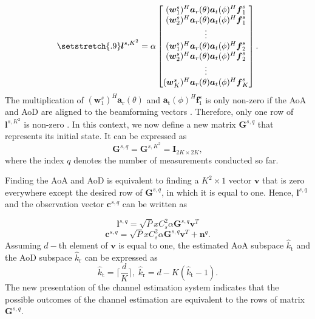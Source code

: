 \documentclass{ieeeaccess}
\begin{document}
\begin{equation} \label{n19}
\setstretch{.9}
\boldsymbol{l}^{s,K^2} =
  \alpha
\begin{bmatrix}
    (\boldsymbol{w}^s_1)^H\boldsymbol{a}_r(\theta) \boldsymbol{a}_t(\phi)^H \boldsymbol{f}^s_1  \\
    (\boldsymbol{w}^s_2)^H\boldsymbol{a}_r(\theta) \boldsymbol{a}_t(\phi)^H \boldsymbol{f}^s_1   \\
    \vdots  \\
    (\boldsymbol{w}^s_1)^H\boldsymbol{a}_r(\theta) \boldsymbol{a}_t(\phi)^H \boldsymbol{f}^s_2  \\
    (\boldsymbol{w}^s_2)^H\boldsymbol{a}_r(\theta) \boldsymbol{a}_t(\phi)^H \boldsymbol{f}^s_2   \\
    \vdots  \\
    (\boldsymbol{w}^s_K)^H\boldsymbol{a}_r(\theta) \boldsymbol{a}_t(\phi)^H \boldsymbol{f}^s_{K}
\end{bmatrix}.
\end{equation}
The multiplication of $(\boldsymbol{w}^s_1)^H\boldsymbol{a}_\textrm{r}(\theta)$ and $\boldsymbol{a}_\textrm{t}(\phi)^H \boldsymbol{f}^s_1$ is only non-zero if the AoA and AoD are aligned to the beamforming vectors \cite{RACE,RH,shaham2018raf}. Therefore, only one row of $\boldsymbol{l}^{s,K^2}$ is non-zero \cite{RH}. In this context, we now define a new matrix $\boldsymbol{G}^{s,q}$ that represents its initial state. It can be expressed as
\begin{equation} \label{n20}
 \boldsymbol{G}^{s,q}=  \boldsymbol{G}^{s,K^2}  =  \mathbf{I}_{2K \times 2K},
\end{equation}
where the index $q$ denotes the number of measurements conducted so far.

Finding the AoA and AoD is equivalent to finding a $K^2 \times 1$ vector $\boldsymbol{v}$ that is zero everywhere except the desired row of $\boldsymbol{G}^{s,q}$, in which it is equal to one. Hence, $\boldsymbol{l}^{s,q}$ and the observation vector $\boldsymbol{c}^{s,q}$ can be written as

\begin{equation} \label{n21}
 \boldsymbol{l}^{s,q} = \sqrt{P}xC_s^2 \alpha  \boldsymbol{G}^{s,q}\boldsymbol{v}^T
\end{equation}
\begin{equation} \label{n22}
\boldsymbol{c}^{s,q} = \sqrt{P}xC_s^2 \alpha  \boldsymbol{G}^{s,q}\boldsymbol{v}^T + \boldsymbol{n}^{q}.
\end{equation}
Assuming $d-$th element of $\boldsymbol{v}$ is equal to one, the estimated AoA subspace $\hat{k}_\textrm{t}$ and the AoD subspace $\hat{k}_\textrm{r}$ can be expressed as
\begin{equation} \label{n23}
\hat{k}_\textrm{t} = \lceil \dfrac{d}{K} \rceil ,\; \hat{k}_\textrm{r} = d - K(\hat{k}_\textrm{t} - 1).
\end{equation}
The new presentation of the channel estimation system indicates that the possible outcomes of the channel estimation are equivalent to the rows of matrix $\boldsymbol{G}^{s,q}$.
\end{document}
